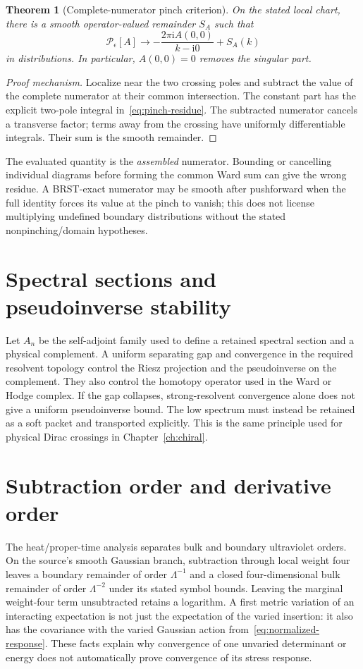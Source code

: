 \documentclass[11pt,a4paper,oneside]{book}
\theoremstyle{plain}
\newtheorem{theorem}{Theorem}[chapter]
\theoremstyle{definition}
\theoremstyle{remark}
\newcommand{\ii}{\mathrm i}
\newcommand{\src}[2]{\cite{#1}}
\begin{document}
\begin{theorem}[Complete-numerator pinch criterion]
\label{thm:pinch}
On the stated local chart, there is a smooth operator-valued remainder $S_A$ such that
\begin{equation}
 \mathcal P_\epsilon[A]\longrightarrow
 -\frac{2\pi\ii A(0,0)}{k-\ii0}+S_A(k)
 \label{eq:pinch-residue}
\end{equation}
in distributions. In particular, $A(0,0)=0$ removes the singular part.
\end{theorem}
\begin{proof}[Proof mechanism]
Localize near the two crossing poles and subtract the value of the complete numerator at their common intersection. The constant part has the explicit two-pole integral in~\eqref{eq:pinch-residue}. The subtracted numerator cancels a transverse factor; terms away from the crossing have uniformly differentiable integrals. Their sum is the smooth remainder.
\end{proof}
\src{R2}{thm:v2v85-residue}
The evaluated quantity is the \emph{assembled} numerator. Bounding or cancelling individual diagrams before forming the common Ward sum can give the wrong residue. A BRST-exact numerator may be smooth after pushforward when the full identity forces its value at the pinch to vanish; this does not license multiplying undefined boundary distributions without the stated nonpinching/domain hypotheses.

\section{Spectral sections and pseudoinverse stability}
Let $A_n$ be the self-adjoint family used to define a retained spectral section and a physical complement. A uniform separating gap and convergence in the required resolvent topology control the Riesz projection and the pseudoinverse on the complement. They also control the homotopy operator used in the Ward or Hodge complex. If the gap collapses, strong-resolvent convergence alone does not give a uniform pseudoinverse bound. The low spectrum must instead be retained as a soft packet and transported explicitly. This is the same principle used for physical Dirac crossings in Chapter~\ref{ch:chiral}. \cite{R2,R3,R12}

\section{Subtraction order and derivative order}
The heat/proper-time analysis separates bulk and boundary ultraviolet orders. On the source's smooth Gaussian branch, subtraction through local weight four leaves a boundary remainder of order $\Lambda^{-1}$ and a closed four-dimensional bulk remainder of order $\Lambda^{-2}$ under its stated symbol bounds. Leaving the marginal weight-four term unsubtracted retains a logarithm. A first metric variation of an interacting expectation is not just the expectation of the varied insertion: it also has the covariance with the varied Gaussian action from~\eqref{eq:normalized-response}. These facts explain why convergence of one unvaried determinant or energy does not automatically prove convergence of its stress response. \cite{R1,R2}
\end{document}
